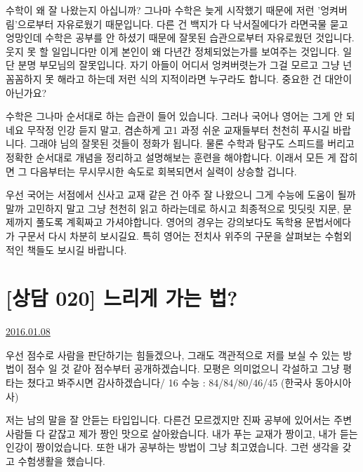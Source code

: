 수학이 왜 잘 나왔는지 아십니까? 그나마 수학은 늦게 시작했기 때문에 저런 '엉켜버림'으로부터 자유로웠기 때문입니다.
다른 건 백지가 다 낙서질에다가 라면국물 묻고 엉망인데 수학은 공부를 안 하셨기 때문에 잘못된 습관으로부터 자유로웠던 것입니다.
웃지 못 할 일입니다만 이게 본인이 왜 다년간 정체되었는가를 보여주는 것입니다.
일단 분명 부모님의 잘못입니다. 자기 아들이 어디서 엉켜버렷는가 그걸 모르고 그냥 넌 꼼꼼하지 못 해라고 하는데
저런 식의 지적이라면 누구라도 합니다. 중요한 건 대안이 아닌가요?
\vspace{5mm}

수학은 그나마 순서대로 하는 습관이 들어 있습니다. 그러나 국어나 영어는 그게 안 되네요
무작정 인강 듣지 말고, 겸손하게 고1 과정 쉬운 교재들부터 천천히 푸시길 바랍니다. 그래야 님의 잘못된 것들이 정화가 됩니다.
물론 수학과 탐구도 스피드를 버리고 정확한 순서대로 개념을 정리하고 설명해보는 훈련을 해야합니다.
이래서 모든 게 잡히면 그 다음부터는 무시무시한 속도로 회복되면서 실력이 상승할 겁니다.
\vspace{5mm}

우선 국어는 서점에서 신사고 교재 같은 건 아주 잘 나왔으니 그게 수능에 도움이 될까말까 고민하지 말고 그냥 천천히 읽고 하라는데로 하시고
최종적으로 밋딧릿 지문, 문제까지 풀도록 계획짜고 가셔야합니다.
영어의 경우는 강의보다도 독학용 문법서에다가 구문서 다시 차분히 보시길요.
특히 영어는 전치사 위주의 구문을 살펴보는 수험외적인 책들도 보시길 바랍니다.
\vspace{5mm}






\section{[상담 020] 느리게 가는 법?}


\href{https://www.kockoc.com/Apoc/580117}{2016.01.08}


우선 점수로 사람을 판단하기는 힘들겠으나, 그래도 객관적으로 저를 보실 수 있는 방법이 점수 일 것 같아 점수부터 공개하겠습니다.
모평은 의미없으니 각설하고 그냥 평타는 쳤다고 봐주시면 감사하겠습니다/
16 수능 : 84/84/80/46/45 (한국사 동아시아사)
\vspace{5mm}
 

저는 남의 말을 잘 안듣는 타입입니다.
다른건 모르겠지만 진짜 공부에 있어서는 주변 사람들 다 같잖고 제가 짱인 맛으로 살아왔습니다.
내가 푸는 교재가 짱이고, 내가 듣는 인강이 짱이었습니다. 또한 내가 공부하는 방법이 그냥 최고였습니다.
그런 생각을 갖고 수험생활을 했습니다.
\vspace{5mm}
 

